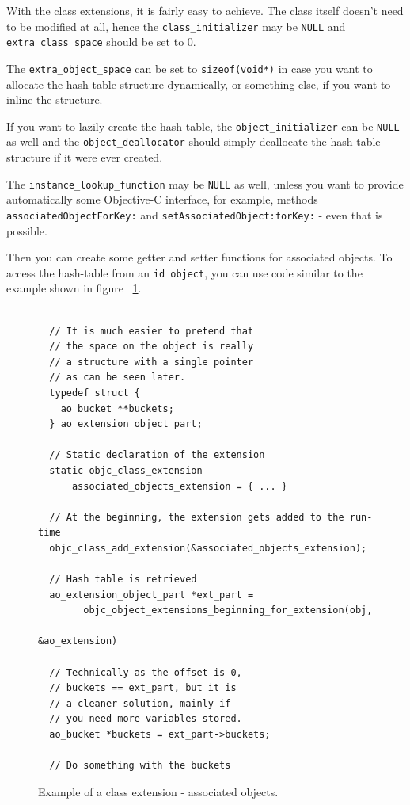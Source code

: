 With the class extensions, it is fairly easy to achieve. The class itself doesn't need to be modified at all, hence the \verb=class_initializer= may be \verb=NULL= and \verb=extra_class_space= should be set to 0.

The \verb=extra_object_space= can be set to \verb=sizeof(void*)= in case you want to allocate the hash-table structure dynamically, or something else, if you want to inline the structure.

If you want to lazily create the hash-table, the \verb=object_initializer= can be \verb=NULL= as well and the \verb=object_deallocator= should simply deallocate the hash-table structure if it were ever created.

The \verb=instance_lookup_function= may be \verb=NULL= as well, unless you want to provide automatically some Objective-C interface, for example, methods \newline{}\verb=associatedObjectForKey:= and \verb=setAssociatedObject:forKey:= - even that is possible.

Then you can create some getter and setter functions for associated objects. To access the hash-table from an \verb=id object=, you can use code similar to the example shown in figure ~\ref{fig:class_ext_ao}.

\begin{figure}[htbp] 
\begin{verbatim}
  
  // It is much easier to pretend that
  // the space on the object is really
  // a structure with a single pointer
  // as can be seen later.
  typedef struct {
    ao_bucket **buckets;
  } ao_extension_object_part;
  
  // Static declaration of the extension
  static objc_class_extension 
      associated_objects_extension = { ... }

  // At the beginning, the extension gets added to the run-time
  objc_class_add_extension(&associated_objects_extension);

  // Hash table is retrieved
  ao_extension_object_part *ext_part = 
        objc_object_extensions_beginning_for_extension(obj, 
                                                      &ao_extension)

  // Technically as the offset is 0,
  // buckets == ext_part, but it is
  // a cleaner solution, mainly if
  // you need more variables stored.
  ao_bucket *buckets = ext_part->buckets;
        
  // Do something with the buckets
\end{verbatim}
  \centering{}
  \caption{Example of a class extension - associated objects.}
  \label{fig:class_ext_ao}
\end{figure}


